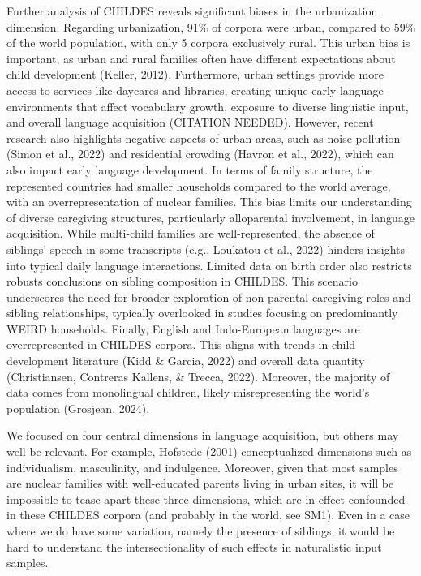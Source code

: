 \documentclass[
  man,floatsintext]{apa6}
\begin{document}
Further analysis of CHILDES reveals significant biases in the urbanization dimension. Regarding urbanization, 91\% of corpora were urban, compared to 59\% of the world population, with only 5 corpora exclusively rural. This urban bias is important, as urban and rural families often have different expectations about child development (Keller, 2012). Furthermore, urban settings provide more access to services like daycares and libraries, creating unique early language environments that affect vocabulary growth, exposure to diverse linguistic input, and overall language acquisition (CITATION NEEDED). However, recent research also highlights negative aspects of urban areas, such as noise pollution (Simon et al., 2022) and residential crowding (Havron et al., 2022), which can also impact early language development.
In terms of family structure, the represented countries had smaller households compared to the world average, with an overrepresentation of nuclear families. This bias limits our understanding of diverse caregiving structures, particularly alloparental involvement, in language acquisition. While multi-child families are well-represented, the absence of siblings' speech in some transcripts (e.g., Loukatou et al., 2022) hinders insights into typical daily language interactions. Limited data on birth order also restricts robusts conclusions on sibling composition in CHILDES. This scenario underscores the need for broader exploration of non-parental caregiving roles and sibling relationships, typically overlooked in studies focusing on predominantly WEIRD households.
Finally, English and Indo-European languages are overrepresented in CHILDES corpora. This aligns with trends in child development literature (Kidd \& Garcia, 2022) and overall data quantity (Christiansen, Contreras Kallens, \& Trecca, 2022). Moreover, the majority of data comes from monolingual children, likely misrepresenting the world's population (Grosjean, 2024).

We focused on four central dimensions in language acquisition, but others may well be relevant. For example, Hofstede (2001) conceptualized dimensions such as individualism, masculinity, and indulgence. Moreover, given that most samples are nuclear families with well-educated parents living in urban sites, it will be impossible to tease apart these three dimensions, which are in effect confounded in these CHILDES corpora (and probably in the world, see SM1). Even in a case where we do have some variation, namely the presence of siblings, it would be hard to understand the intersectionality of such effects in naturalistic input samples.
\end{document}
